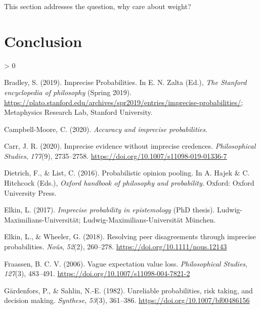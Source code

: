 \documentclass[
  10pt,
  dvipsnames,enabledeprecatedfontcommands]{scrartcl}
\newlength{\cslhangindent}
\newenvironment{CSLReferences}[2] %
 {%
  \setlength{\parindent}{0pt}
  \ifodd #1 \everypar{\setlength{\hangindent}{\cslhangindent}}\ignorespaces\fi
  \ifnum #2 > 0
  \setlength{\parskip}{#2\baselineskip}
  \fi
 }%
 {}
\begin{document}
This section addresses the question, why care about weight?

\hypertarget{conclusion}{%
\section*{Conclusion}\label{conclusion}}

\hypertarget{refs}{}
\begin{CSLReferences}{1}{0}
\leavevmode\hypertarget{ref-bradley2019imprecise}{}%
Bradley, S. (2019). {Imprecise Probabilities}. In E. N. Zalta (Ed.),
\emph{The {Stanford} encyclopedia of philosophy} ({S}pring 2019).
\url{https://plato.stanford.edu/archives/spr2019/entries/imprecise-probabilities/};
Metaphysics Research Lab, Stanford University.

\leavevmode\hypertarget{ref-CampbellMoore2020accuracy}{}%
Campbell-Moore, C. (2020). \emph{Accuracy and imprecise probabilities}.

\leavevmode\hypertarget{ref-Carr2020impreciseEvidence}{}%
Carr, J. R. (2020). Imprecise evidence without imprecise credences.
\emph{Philosophical Studies}, \emph{177}(9), 2735--2758.
\url{https://doi.org/10.1007/s11098-019-01336-7}

\leavevmode\hypertarget{ref-Dietrich2016pooling}{}%
Dietrich, F., \& List, C. (2016). Probabilistic opinion pooling. In A.
Hajek \& C. Hitchcock (Eds.), \emph{Oxford handbook of philosophy and
probability}. Oxford: Oxford University Press.

\leavevmode\hypertarget{ref-Lee2017impreciseEpistemology}{}%
Elkin, L. (2017). \emph{Imprecise probability in epistemology} (PhD
thesis). Ludwig-Maximilians-Universit{ä}t;
Ludwig-Maximilians-Universität München.

\leavevmode\hypertarget{ref-Elkin2018resolving}{}%
Elkin, L., \& Wheeler, G. (2018). Resolving peer disagreements through
imprecise probabilities. \emph{Noûs}, \emph{52}(2), 260--278.
\url{https://doi.org/10.1111/nous.12143}

\leavevmode\hypertarget{ref-VanFraassen2006vague}{}%
Fraassen, B. C. V. (2006). Vague expectation value loss.
\emph{Philosophical Studies}, \emph{127}(3), 483--491.
\url{https://doi.org/10.1007/s11098-004-7821-2}

\leavevmode\hypertarget{ref-Gardenfors1982unreliable}{}%
Gärdenfors, P., \& Sahlin, N.-E. (1982). Unreliable probabilities, risk
taking, and decision making. \emph{Synthese}, \emph{53}(3), 361--386.
\url{https://doi.org/10.1007/bf00486156}


\end{CSLReferences}
\end{document}
